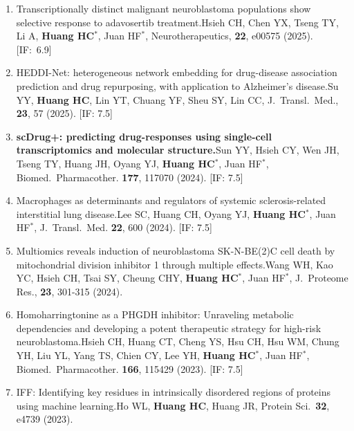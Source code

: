 \documentclass[10pt,a4paper]{article}
\def\mypub#1#2#3{{#1.}\newline #2, #3.}
\def\mybpub#1#2#3{{\boldmath \bf #1.}\newline #2, #3.}
\begin{document}
\begin{enumerate}
\item \mypub{
Transcriptionally distinct malignant neuroblastoma populations show selective response to adavosertib treatment}
{Hsieh CH, Chen YX, Tseng TY, Li A, {\bf Huang HC$^*$}, Juan HF$^*$}
{Neurotherapeutics, {\bf 22}, e00575 (2025)}
[IF:~6.9]

\item \mypub{
HEDDI-Net: heterogeneous network embedding for drug-disease association prediction and drug repurposing, with application to Alzheimer's disease}
{Su YY, {\bf Huang HC}, Lin YT, Chuang YF, Sheu SY, Lin CC}
{J.\ Transl.\ Med., {\bf 23}, 57 (2025)}
[IF: 7.5]

\item \mybpub{
scDrug+: predicting drug-responses using single-cell transcriptomics and molecular structure}
{Sun YY, Hsieh CY, Wen JH, Tseng TY, Huang JH, Oyang YJ, {\bf Huang HC$^*$}, Juan HF$^*$}
{Biomed.\ Pharmacother. {\bf 177}, 117070 (2024)}
[IF: 7.5]

\item \mypub{
Macrophages as determinants and regulators of systemic sclerosis-related interstitial lung disease}
{Lee SC, Huang CH, Oyang YJ, {\bf Huang HC$^*$}, Juan HF$^*$}
{J.\ Transl.\ Med. {\bf 22}, 600 (2024)}
[IF: 7.5]

\item \mypub{
Multiomics reveals induction of neuroblastoma SK-N-BE(2)C cell death by mitochondrial division inhibitor 1 through multiple effects}
{Wang WH, Kao YC, Hsieh CH, Tsai SY, Cheung CHY, {\bf Huang HC$^*$}, Juan HF$^*$}
{J.\ Proteome Res., {\bf 23}, 301-315 (2024)}

\item \mypub{
Homoharringtonine as a PHGDH inhibitor: Unraveling metabolic dependencies and developing a potent therapeutic strategy for high-risk neuroblastoma}
{Hsieh CH, Huang CT, Cheng YS, Hsu CH, Hsu WM, Chung YH, Liu YL, Yang TS, Chien CY, Lee YH, {\bf Huang HC$^*$}, Juan HF$^*$}
{Biomed.\ Pharmacother. {\bf 166}, 115429 (2023)}
[IF: 7.5]

\item \mypub{
IFF: Identifying key residues in intrinsically disordered regions of proteins using machine learning}
{Ho WL, {\bf Huang HC}, Huang JR}
{Protein Sci.\ {\bf 32}, e4739 (2023)}


\end{enumerate}
\end{document}
